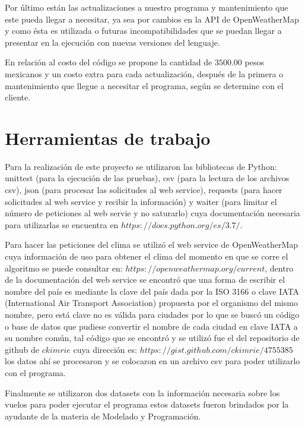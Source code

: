 \documentclass[]{article}
\begin{document}
Por último están las actualizaciones a nuestro programa y mantenimiento
que este pueda llegar a necesitar, ya sea por cambios en la API de
OpenWeatherMap y como ésta es utilizada o futuras incompatibilidades que
se puedan llegar a presentar en la ejecución con nuevas versiones del
lenguaje.

En relación al costo del código se propone la cantidad de $ 3500.00 $ pesos
mexicanos y un costo extra para cada actualización, después de la primera o
mantenimiento que llegue a necesitar el programa, según se determine con
el cliente.

\section{Herramientas de trabajo}
Para la realización de este proyecto se utilizaron las bibliotecas de Python: unittest (para la ejecución de las pruebas), csv (para la lectura de los archivos csv), json (para procesar las solicitudes al web service), requests (para hacer solicitudes al web service y recibir la información) y waiter (para limitar el número de peticiones al web servie y no saturarlo) cuya documentación necesaria para utilizarlas se encuentra en $ https://docs.python.org/es/3.7/ $.

Para hacer las peticiones del clima se utilizó el web service de OpenWeatherMap cuya información de uso para obtener el clima del momento en que se corre el algoritmo se puede consultar en: $ https://openweathermap.org/current $, dentro de la documentación del web service se encontró que una forma de escribir el nombre del país es mediante la clave del país dada por la ISO 3166 o clave IATA (International Air Transport Association) propuesta por el organismo del mismo nombre, pero está clave no es válida para ciudades por lo que se buscó un código o base de datos que pudiese convertir el nombre de cada ciudad en clave IATA a su nombre común, tal código que se encontró y se utilizó fue el del repositorio de github de $ ckimrie $ cuya dirección es: $ https://gist.github.com/ckimrie/4755385 $ los datos ahí se procesaron y se colocaron en un archivo csv para poder utilizarlo con el programa.

Finalmente se utilizaron dos datasets con la información necesaria sobre los vuelos para poder ejecutar el programa estos datasets fueron brindados por la ayudante de la materia de Modelado y Programación.
\end{document}

